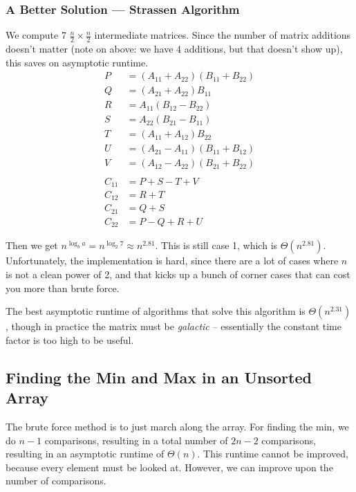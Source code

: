 \documentclass[11pt]{article}
\begin{document}
\subsubsection{A Better Solution --- Strassen Algorithm}
We compute 7 $\frac{n}{2} \times \frac{n}{2}$ intermediate matrices. Since the number of matrix additions doesn't matter (note on above: we have 4 additions, but that doesn't show up), this saves on asymptotic runtime.
\begin{align*}
    P &= (A_{11} + A_{22})(B_{11} + B_{22}) \\
    Q &= (A_{21} + A_{22}) B_{11} \\
    R &= A_{11} (B_{12} - B_{22}) \\
    S &= A_{22}(B_{21} - B_{11}) \\
    T &= (A_{11} + A_{12})B_{22} \\
    U &= (A_{21} - A_{11})(B_{11}+B_{12}) \\
    V &= (A_{12} - A_{22})(B_{21} + B_{22}) \\
    \\
    C_{11} &= P + S - T + V \\
    C_{12} &= R + T \\
    C_{21} &= Q + S \\
    C_{22} &= P - Q + R + U
\end{align*}

Then we get $n^{\log_b a} = n^{\log_2 7} \approx n^{2.81}$. This is still case 1, which is $\Theta(n^{2.81})$. Unfortunately, the implementation is hard, since there are a lot of cases where $n$ is not a clean power of 2, and that kicks up a bunch of corner cases that can cost you more than brute force.

The best asymptotic runtime of algorithms that solve this algorithm is $\Theta(n^{2.31})$, though in practice the matrix must be \textit{galactic} -- essentially the constant time factor is too high to be useful.

\subsection{Finding the Min and Max in an Unsorted Array}
The brute force method is to just march along the array. For finding the min, we do $n-1$ comparisons, resulting in a total number of $2n-2$ comparisons, resulting in an asymptotic runtime of $\Theta(n)$. This runtime cannot be improved, because every element must be looked at. However, we can improve upon the number of comparisons.
\end{document}

